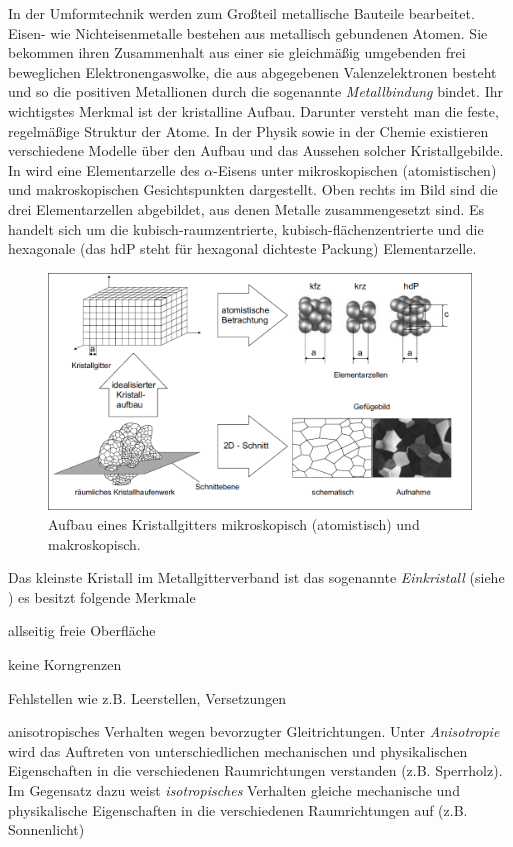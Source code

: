 \documentclass[12pt,a4paper,parskip,twoside,BCOR5mm,headsepline]{scrartcl}
\begin{document}
\begin{description*}
\begin{itemize*}
In der Umformtechnik werden zum Großteil metallische Bauteile bearbeitet. Eisen- wie Nichteisenmetalle bestehen aus metallisch gebundenen Atomen. Sie bekommen ihren Zusammenhalt aus einer sie gleichmäßig umgebenden frei beweglichen Elektronengaswolke, die aus abgegebenen Valenzelektronen besteht und so die positiven Metallionen  durch die sogenannte \emph{Metallbindung} bindet. \autocite[12]{wki} Ihr wichtigstes Merkmal ist der kristalline Aufbau. Darunter versteht man die feste, regelmäßige Struktur der Atome. In der Physik sowie in der Chemie existieren verschiedene Modelle über den Aufbau und das Aussehen solcher Kristallgebilde. In  wird eine Elementarzelle des $\alpha $-Eisens unter mikroskopischen (atomistischen) und makroskopischen Gesichtspunkten dargestellt. Oben rechts im Bild sind die drei Elementarzellen abgebildet, aus denen Metalle zusammengesetzt sind. Es handelt sich um die  kubisch-raumzentrierte, kubisch-flächenzentrierte und die hexagonale (das hdP steht für hexagonal dichteste Packung) Elementarzelle. \autocite[3-5]{fu}
\begin{figure}
\centering
\includegraphics[width=.8\textwidth]{makromikro}
\caption[Aufbau Kristallgitter]{Aufbau eines Kristallgitters mikroskopisch (atomistisch) und makroskopisch. \autocite[4]{fu}}
\label{fig:makromikro}
\end{figure}


Das kleinste Kristall im Metallgitterverband ist das sogenannte \emph{Einkristall} (siehe ) es besitzt folgende Merkmale




\begin{itemize*}
\item allseitig freie Oberfläche
\item keine Korngrenzen
\item Fehlstellen wie z.B. Leerstellen, Versetzungen
\item anisotropisches Verhalten wegen bevorzugter Gleitrichtungen. Unter \emph{Anisotropie} wird das Auftreten von unterschiedlichen mechanischen und physikalischen Eigenschaften in die verschiedenen Raumrichtungen verstanden (z.B. Sperrholz). Im Gegensatz dazu weist \emph{isotropisches} Verhalten gleiche mechanische und physikalische Eigenschaften in die verschiedenen Raumrichtungen auf (z.B. Sonnenlicht) \autocite[37]{hu}



\end{itemize*}
\end{itemize*}
\end{description*}
\end{document}

